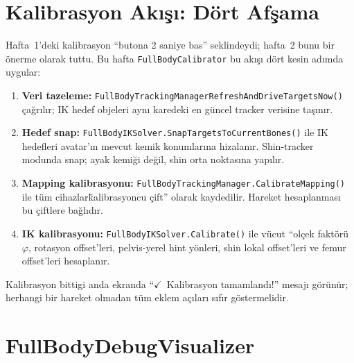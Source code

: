 \documentclass[11pt,a4paper]{article}
\begin{document}
\section{Kalibrasyon Ak{\i}\c{s}{\i}: D\"ort Af\c{s}ama}
\label{sec:kalibrasyon}

Hafta~1'deki kalibrasyon ``butona 2 saniye bas'' seklindeydi;
hafta~2 bunu bir \"onerme olarak tuttu. Bu hafta \texttt{FullBodyCalibrator}
bu ak{\i}\c{s}{\i} d\"ort kesin ad{\i}mda uygular:

\begin{enumerate}
    \item \textbf{Veri tazeleme:}
          \texttt{FullBodyTrackingManagerRe\-fresh\-And\-Drive\-Tar\-gets\-Now()}
          \c{c}a\u{g}r{\i}l{\i}r; IK hedef objeleri ayn{\i} karedeki
          en g\"uncel tracker verisine ta\c{s}{\i}n{\i}r.

    \item \textbf{Hedef snap:}
          \texttt{FullBodyIKSolver\-.Snap\-Targets\-To\-Current\-Bones()} ile
          IK hedefleri avatar'{\i}n mevcut kemik konumlar{\i}na hizalanır.
          Shin-tracker modunda snap; ayak kemi\u{g}i de\u{g}il,
          shin orta noktas{\i}na yap{\i}l{\i}r.

    \item \textbf{Mapping kalibrasyonu:}
          \texttt{FullBodyTrackingManager\-.Calibrate\-Mapping()} ile
          t\"um cihazlar\"kalibrasyoncu \c{c}ift'' olarak kaydedilir.
          Hareket hesaplanmas{\i} bu \c{c}iftlere ba\u{g}l{\i}d{\i}r.

    \item \textbf{IK kalibrasyonu:}
          \texttt{FullBodyIKSolver.Calibrate()} ile v\"ucut ``ol\c{c}ek
          fakt\"or\"u~$\varphi$, rotasyon offset'leri, pelvis-yerel
          hint y\"onleri, shin lokal offset'leri ve femur offset'leri
          hesaplan{\i}r.
\end{enumerate}

Kalibrasyon bittigi anda ekranda
``$\checkmark$~Kalibrasyon tamamland{\i}!'' mesaj{\i} g\"or\"un\"ur;
herhangi bir hareket olmadan t\"um eklem a\c{c}{\i}lar{\i}
s{\i}f{\i}r g\"ostermelidir.

\section{FullBodyDebugVisualizer}
\label{sec:debug}
\end{document}
